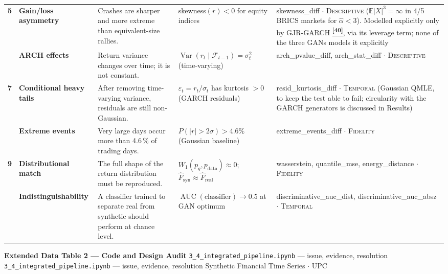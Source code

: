 \documentclass[10pt]{article}
\newcommand{\pagehead}[2]{%
  \begin{tcolorbox}[enhanced,arc=0pt,outer arc=0pt,boxrule=0pt,
    colback=Navy,colframe=Navy,
    top=5pt,bottom=5pt,left=8pt,right=8pt,
    before skip=0pt,after skip=10pt]
  {\color{white}\large\bfseries #1}%
  \ifx\relax#2\relax\else\\[1pt]{\color{blue!30!white}\small #2}\fi
  \hfill{\color{blue!20!white}\footnotesize Synthetic Financial Time Series $\cdot$ UPC}
  \end{tcolorbox}}
\newcommand{\tcite}[1]{%
  \hyperlink{R:#1}{\textsuperscript{\scriptsize\textbf{[#1]}}}}
\newcommand{\E}{\mathbb{E}}
\begin{document}
\begin{longtable}{%
  >{\bfseries\centering}p{}
  >{\bfseries}p{}
  p{}
  p{}
  p{}}
\rowcolor{TabOdd}
5 & Gain/loss asymmetry &
  Crashes are sharper and more extreme than equivalent-size rallies. &
  skewness$(r) < 0$ for equity indices &
  skewness\_diff $\cdot$ \textsc{Descriptive} ($\E|X|^3=\infty$ in 4/5 BRICS markets for $\hat{\alpha}<3$). Modelled explicitly only by GJR-GARCH\tcite{40}, via its leverage term; none of the three GANs models it explicitly \\

6 & ARCH effects &
  Return variance changes over time; it is not constant. &
  $\operatorname{Var}(r_t \mid \mathcal{F}_{t-1}) = \sigma^2_t$ (time-varying) &
  arch\_pvalue\_diff, arch\_stat\_diff $\cdot$ \textsc{Descriptive} \\

\rowcolor{TabOdd}
7 & Conditional heavy tails &
  After removing time-varying variance, residuals are still non-Gaussian. &
  $\varepsilon_t = r_t/\sigma_t$ has kurtosis $> 0$ (GARCH residuals) &
  resid\_kurtosis\_diff $\cdot$ \textsc{Temporal} (Gaussian QMLE, to keep the test able to fail; circularity with the GARCH generators is discussed in Results) \\

8 & Extreme events &
  Very large days occur more than 4.6\,\% of trading days. &
  $P(|r| > 2\sigma) > 4.6\%$ (Gaussian baseline) &
  extreme\_events\_diff $\cdot$ \textsc{Fidelity} \\

\rowcolor{TabOdd}
9 & Distributional match &
  The full shape of the return distribution must be reproduced. &
  $W_1(p_g, p_\text{data}) \approx 0$; $\hat{F}_\text{syn} \approx \hat{F}_\text{real}$ &
  wasserstein, quantile\_mse, energy\_distance $\cdot$ \textsc{Fidelity} \\

10 & Indistinguishability &
  A classifier trained to separate real from synthetic should perform at chance level. &
  $\operatorname{AUC}(\text{classifier}) \to 0.5$ at GAN optimum &
  discriminative\_auc\_dist, discriminative\_auc\_absz $\cdot$ \textsc{Temporal} \\

\bottomrule
\end{longtable}

\clearpage

\pagehead{Extended Data Table 2 --- Code and Design Audit}
         {\texttt{3\_4\_integrated\_pipeline.ipynb} --- issue, evidence, resolution}
\end{document}
